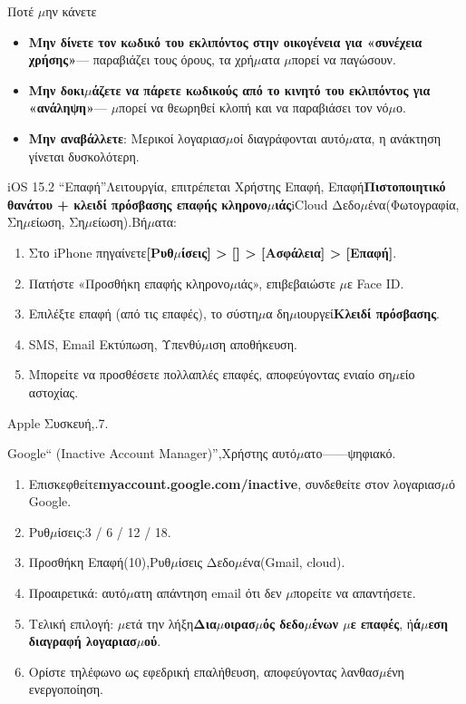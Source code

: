 \begin{tcbwarn}{Ποτέ $\mu$ην κάνετε}
\begin{itemize}
  \item \textbf{Μην δίνετε τον κωδικό του εκλιπόντος στην οικογένεια για «συνέχεια χρήσης»}— παραβιάζει τους όρους, τα χρή$\mu$ατα $\mu$πορεί να παγώσουν.
  \item \textbf{Μην δοκι$\mu$άζετε να πάρετε κωδικούς από το κινητό του εκλιπόντος για «ανάληψη»}— $\mu$πορεί να θεωρηθεί κλοπή και να παραβιάσει τον νό$\mu$ο.
  \item \textbf{Μην αναβάλλετε}: Μερικοί λογαριασ$\mu$οί διαγράφονται αυτό$\mu$ατα, η ανάκτηση γίνεται δυσκολότερη.
\end{itemize}

\end{tcbwarn}


iOS 15.2 “Επαφή”Λειτουργία, επιτρέπεται Χρήστης Επαφή, Επαφή\textbf{Πιστοποιητικό θανάτου + κλειδί πρόσβασης επαφής κληρονο$\mu$ιάς}iCloud Δεδο$\mu$ένα(Φωτογραφία, Ση$\mu$είωση, Ση$\mu$είωση).Βή$\mu$ατα:

\begin{enumerate}
  \item Στο iPhone πηγαίνετε\textbf{[Ρυθ$\mu$ίσεις] > [] > [Ασφάλεια] > [Επαφή]}.
  \item Πατήστε «Προσθήκη επαφής κληρονο$\mu$ιάς», επιβεβαιώστε $\mu$ε Face ID.
  \item Επιλέξτε επαφή (από τις επαφές), το σύστη$\mu$α δη$\mu$ιουργεί\textbf{Κλειδί πρόσβασης}.
  \item SMS, Email Εκτύπωση, Υπενθύ$\mu$ιση αποθήκευση.
  \item Μπορείτε να προσθέσετε πολλαπλές επαφές, αποφεύγοντας ενιαίο ση$\mu$είο αστοχίας.
\end{enumerate}

Apple Συσκευή,.7.


Google“ (Inactive Account Manager)”,Χρήστης αυτό$\mu$ατο——ψηφιακό.

\begin{enumerate}
  \item Επισκεφθείτε\textbf{myaccount.google.com/inactive}, συνδεθείτε στον λογαριασ$\mu$ό Google.
  \item Ρυθ$\mu$ίσεις:3 / 6 / 12 / 18.
  \item Προσθήκη Επαφή(10),Ρυθ$\mu$ίσεις Δεδο$\mu$ένα(Gmail, cloud).
  \item Προαιρετικά: αυτό$\mu$ατη απάντηση email ότι δεν $\mu$πορείτε να απαντήσετε.
  \item Τελική επιλογή: $\mu$ετά την λήξη\textbf{Δια$\mu$οιρασ$\mu$ός δεδο$\mu$ένων $\mu$ε επαφές}, ή\textbf{ά$\mu$εση διαγραφή λογαριασ$\mu$ού}.
  \item Ορίστε τηλέφωνο ως εφεδρική επαλήθευση, αποφεύγοντας λανθασ$\mu$ένη ενεργοποίηση.
\end{enumerate}

